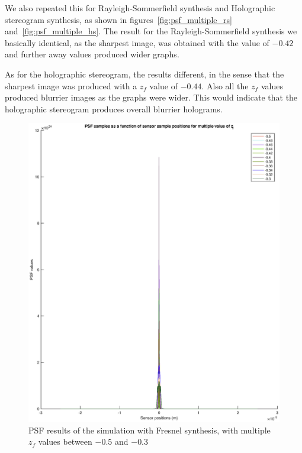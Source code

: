 \documentclass[12pt,a4paper,english
]{tunithesis}
\begin{document}
We also repeated this for Rayleigh-Sommerfield synthesis and Holographic stereogram synthesis, as shown in figures~\ref{fig:psf_multiple_rs} and~\ref{fig:psf_multiple_hs}. The result for the Rayleigh-Sommerfield synthesis we basically identical, as the sharpest image, was obtained with the value of $-0.42$ and further away values produced wider graphs.

As for the holographic stereogram, the results different, in the sense that the sharpest image was produced with a $z_f$ value of $-0.44$. Also all the $z_f$ values produced blurrier images as the graphs were wider. This would indicate that the holographic stereogram produces overall blurrier holograms.

\begin{figure}
  \centering
  \includegraphics[width=\columnwidth]{img/psf_multiple_fresnel.eps}
  \caption{PSF results of the simulation with Fresnel synthesis, with multiple $z_f$ values between $-0.5$ and $-0.3$}
  \label{fig:psf_multiple_fresnel}
\end{figure}
\end{document}
